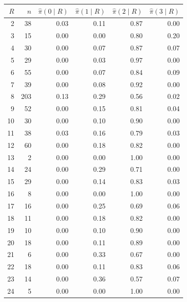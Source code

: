 \begin{tabular}{rrrrrr}
\toprule
$R$ & $n$ & $\hat\pi(0\mid R)$ & $\hat\pi(1\mid R)$ & $\hat\pi(2\mid R)$ & $\hat\pi(3\mid R)$ \\
\midrule
2 & 38 & 0.03 & 0.11 & 0.87 & 0.00 \\
3 & 15 & 0.00 & 0.00 & 0.80 & 0.20 \\
4 & 30 & 0.00 & 0.07 & 0.87 & 0.07 \\
5 & 29 & 0.00 & 0.03 & 0.97 & 0.00 \\
6 & 55 & 0.00 & 0.07 & 0.84 & 0.09 \\
7 & 39 & 0.00 & 0.08 & 0.92 & 0.00 \\
8 & 203 & 0.13 & 0.29 & 0.56 & 0.02 \\
9 & 52 & 0.00 & 0.15 & 0.81 & 0.04 \\
10 & 30 & 0.00 & 0.10 & 0.90 & 0.00 \\
11 & 38 & 0.03 & 0.16 & 0.79 & 0.03 \\
12 & 60 & 0.00 & 0.18 & 0.82 & 0.00 \\
13 & 2 & 0.00 & 0.00 & 1.00 & 0.00 \\
14 & 24 & 0.00 & 0.29 & 0.71 & 0.00 \\
15 & 29 & 0.00 & 0.14 & 0.83 & 0.03 \\
16 & 8 & 0.00 & 0.00 & 1.00 & 0.00 \\
17 & 16 & 0.00 & 0.25 & 0.69 & 0.06 \\
18 & 11 & 0.00 & 0.18 & 0.82 & 0.00 \\
19 & 10 & 0.00 & 0.10 & 0.90 & 0.00 \\
20 & 18 & 0.00 & 0.11 & 0.89 & 0.00 \\
21 & 6 & 0.00 & 0.33 & 0.67 & 0.00 \\
22 & 18 & 0.00 & 0.11 & 0.83 & 0.06 \\
23 & 14 & 0.00 & 0.36 & 0.57 & 0.07 \\
24 & 5 & 0.00 & 0.00 & 1.00 & 0.00 \\
\bottomrule
\end{tabular}
